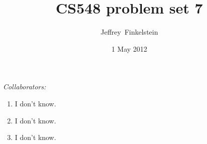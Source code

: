 \documentclass[draft]{article}
\author{Jef{}frey~Finkelstein}
\date{1 May 2012}
\title{CS548 problem set 7}
\newcommand{\collaborators}[1]{\emph{Collaborators: #1}}
\begin{document}
\maketitle
\collaborators{}
\begin{enumerate}
\item I don't know.
\item I don't know.
\item I don't know.
\end{enumerate}
\end{document}

